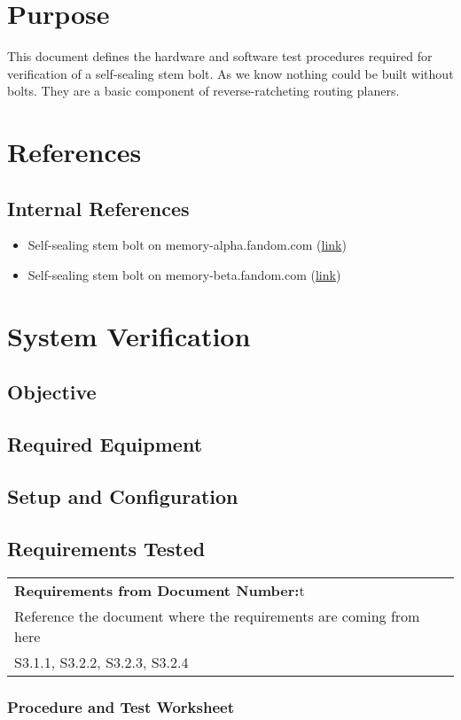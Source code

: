 \documentclass[a4paper,12pt]{article}
\begin{document}
\section{Purpose}
This document defines the hardware and software test procedures required for verification of a
self-sealing stem bolt. As we know nothing could be built without bolts. They are a basic component of reverse-ratcheting routing planers.
\section{References}

\subsection{Internal References}

\begin{itemize}
	\item       Self-sealing stem bolt on memory-alpha.fandom.com (\href{https://memory-alpha.fandom.com/wiki/Self-sealing_stem_bolt}{link})
	\item  Self-sealing stem bolt on memory-beta.fandom.com (\href{https://memory-beta.fandom.com/wiki/Self-sealing_stembolt}{link})
\end{itemize}

\section{System Verification}
\subsection{Objective}
\subsection{Required Equipment}
\subsection{Setup and Configuration}
\subsection{Requirements Tested}



\begin{tabularx}{\textwidth}{|X|}
	\hline
	\textbf{Requirements from Document Number:}t \\ Reference the document where the requirements are coming from here \\ \hline
	S3.1.1, S3.2.2, S3.2.3, S3.2.4               \\ \hline
\end{tabularx}


\subsubsection{Procedure and Test Worksheet}
\end{document}
